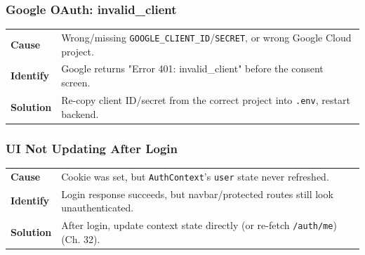 \subsubsection*{Google OAuth: invalid\_client}
\noindent\begin{tabularx}{\textwidth}{@{}>{\bfseries}p{2.3cm}X@{}}
\toprule
Cause & Wrong/missing \texttt{GOOGLE\_CLIENT\_ID}/\texttt{SECRET}, or wrong Google Cloud project. \\
Identify & Google returns "Error 401: invalid\_client" before the consent screen. \\
Solution & Re-copy client ID/secret from the correct project into \texttt{.env}, restart backend. \\
\bottomrule
\end{tabularx}

\subsubsection*{UI Not Updating After Login}
\noindent\begin{tabularx}{\textwidth}{@{}>{\bfseries}p{2.3cm}X@{}}
\toprule
Cause & Cookie was set, but \texttt{AuthContext}'s \texttt{user} state never refreshed. \\
Identify & Login response succeeds, but navbar/protected routes still look unauthenticated. \\
Solution & After login, update context state directly (or re-fetch \texttt{/auth/me}) (Ch. 32). \\
\bottomrule
\end{tabularx}
